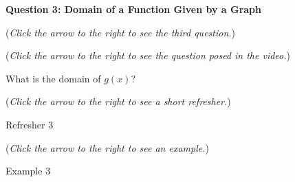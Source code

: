 \documentclass{ximera}
\begin{document}
\textbf{Question 3: Domain of a Function Given by a Graph}
\begin{question}
\begin{flushright}
{\color{blue}(\emph{Click the arrow to the right to see the third question.})}
\end{flushright}
\begin{center}
\begin{expandable}
\begin{flushright}
{\color{blue}(\emph{Click the arrow to the right to see the question
posed in the video.})}
\end{flushright}
\begin{expandable}
What is the domain of $g(x)$?
\begin{multipleChoice}
\choice[correct]{$[-1,1)\cup(1,3]\cup[4,6]$}
\choice{$[-1,3]\cup[4,6]$}
\choice{$\{2\} \cup [6,15)$}
\choice{$\{2\}\cup [9,15)$}
\choice{$\{2\} \cup [6,9)$}
\end{multipleChoice}
\begin{flushright}
{\color{blue}(\emph{Click the arrow to the right to see a short refresher.})}
\end{flushright}
\begin{expandable}
\begin{center}
Refresher 3
\end{center}
\end{expandable}
\begin{flushright}
{\color{blue}(\emph{Click the arrow to the right to see an example.})}
\end{flushright}
\begin{expandable}
\begin{center}
Example 3
\end{center}
\end{expandable}
\end{expandable}
\end{expandable}
\end{center}
\end{question}
\end{document}
